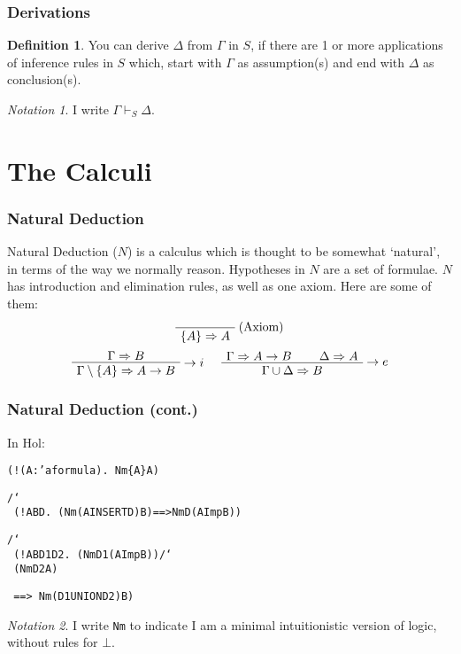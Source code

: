 \documentclass[english,svgnames,hide notes,12pt]{beamer}
\theoremstyle{definition}
\newtheorem{defn}{Definition}
\theoremstyle{remark}
\newtheorem{notn}{Notation}
\begin{document}
\begin{frame}
    \frametitle{Derivations}
    \begin{defn}
         You can derive $\Delta$ from $\Gamma$ in $S$, 
         if there are 1 or more applications of inference rules in $S$ which, 
         start with $\Gamma$ as assumption(s) and end with $\Delta$ as conclusion(s).
    \end{defn}
    \begin{notn}
        I write $\Gamma \vdash_S \Delta$. 
    \end{notn}
\end{frame}

\section{The Calculi}

\begin{frame}
    \frametitle{Natural Deduction}
    Natural Deduction ($N$) is a calculus which is thought to be somewhat `natural', in terms of the way we normally reason. Hypotheses in $N$ are a set of formulae. $N$ has introduction and elimination rules, as well as one axiom. Here are some of them:

    \[
        \AxiomC{}
        \RightLabel{(Axiom)}
        \UnaryInfC{$\{A\} \Rightarrow A$}
        \DisplayProof 
    \]
    \[
        \AxiomC{$\Gamma \Rightarrow B$}
        \RightLabel{$\to i$}
        \UnaryInfC{$\Gamma\setminus\{A\}\Rightarrow A\to B$}
        \DisplayProof
        \hspace{0.5cm}
        \AxiomC{$\Gamma\Rightarrow A\to B$}
        \AxiomC{$\Delta\Rightarrow A$}
        \RightLabel{$\to e$}
        \BinaryInfC{$\Gamma\cup\Delta\Rightarrow B$}
        \DisplayProof
    \]
\end{frame}
\begin{frame}
    \frametitle{Natural Deduction (cont.)}
    In Hol:
    \begin{alltt}
        (! (A :'a formula).\ Nm \{A\} A)

        /\char`\\\ (!A B D.\ (Nm (A INSERT D) B) ==> Nm D (A Imp B))

        /\char`\\\ (!A B D1 D2.\ (Nm D1 (A Imp B)) /\char`\\\ (Nm D2 A)

        ~ ==>\ Nm (D1 UNION D2) B)
    \end{alltt}
    \begin{notn}
        I write \texttt{Nm} to indicate I am a minimal intuitionistic version of logic, without rules for $\bot$.
    \end{notn}
\end{frame}
\end{document}
